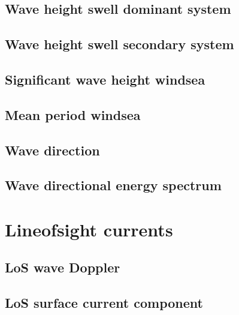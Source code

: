 \documentclass[a4paper,10pt,english]{sphinxmanual}
\begin{document}
\subsection{Wave height swell dominant system}
\label{\detokenize{05_reference_datasets:wave-height-swell-dominant-system}}

\subsection{Wave height swell secondary system}
\label{\detokenize{05_reference_datasets:wave-height-swell-secondary-system}}

\subsection{Significant wave height wind\sphinxhyphen{}sea}
\label{\detokenize{05_reference_datasets:significant-wave-height-wind-sea}}

\subsection{Mean period wind\sphinxhyphen{}sea}
\label{\detokenize{05_reference_datasets:mean-period-wind-sea-1}}\label{\detokenize{05_reference_datasets:id5}}

\subsection{Wave direction}
\label{\detokenize{05_reference_datasets:wave-direction}}

\subsection{Wave directional energy spectrum}
\label{\detokenize{05_reference_datasets:wave-directional-energy-spectrum}}

\section{Line\sphinxhyphen{}of\sphinxhyphen{}sight currents}
\label{\detokenize{05_reference_datasets:line-of-sight-currents}}

\subsection{LoS wave Doppler}
\label{\detokenize{05_reference_datasets:los-wave-doppler}}

\subsection{LoS surface current component}
\label{\detokenize{05_reference_datasets:los-surface-current-component}}
\end{document}
